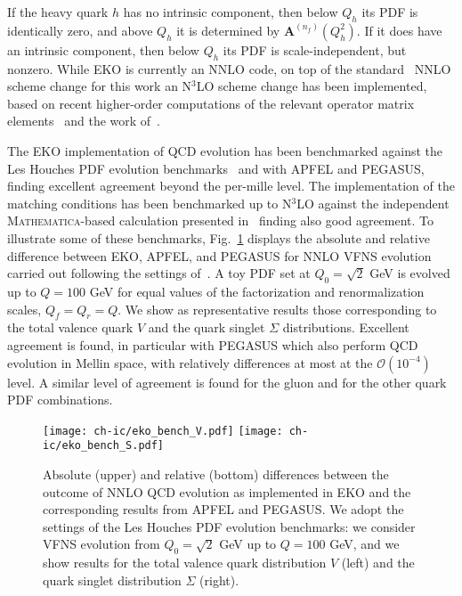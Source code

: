 If the heavy quark $h$ has no intrinsic component, then below $Q_h$
its PDF is identically zero, and above $Q_h$ it is determined by
$\mathbf{A}^{(n_f)}(Q_{h}^2)$. If it does have an intrinsic
component, then  below $Q_h$ its PDF is scale-independent, but nonzero.
While  \textsc{\small EKO} is currently an NNLO code, on
top of the standard~\cite{pdfnnlo} NNLO scheme change for this work
an N$^3$LO scheme change has been implemented, based on recent higher-order computations
of the relevant operator matrix elements~\cite{Bierenbaum:2009zt,Bierenbaum:2009mv,Ablinger:2010ty,Ablinger:2014vwa,Ablinger:2014uka,Behring:2014eya,Blumlein:2017wxd,Ablinger_2014,Ablinger:2014nga}
and the work of~\cite{zanoli}.

The  \textsc{\small EKO} implementation of QCD evolution has been
benchmarked against the Les Houches PDF evolution
benchmarks~\cite{Dittmar:2005ed,Giele:2002hx} and with
\textsc{\small APFEL} and \textsc{\small PEGASUS},
finding excellent agreement beyond the per-mille level.
%
The implementation of the  matching conditions
has been benchmarked up to N$^3$LO against the independent \textsc{\small Mathematica}-based calculation 
presented in~\cite{zanoli} finding also good agreement.
%
To illustrate some of these benchmarks, Fig.~\ref{fig:ic/EKObench} displays
the absolute and relative difference between \textsc{\small EKO},
\textsc{\small APFEL}, and \textsc{\small PEGASUS}
for NNLO VFNS evolution
carried out
following the settings of~\cite{Dittmar:2005ed,Giele:2002hx}.
%
A toy PDF set at $Q_0=\sqrt{2}$ GeV is evolved up to $Q=100$ GeV
for equal values of the factorization and renormalization scales, $Q_f=Q_r=Q$.
%
We show as representative results those corresponding to
the  total valence quark  $V$ 
and the quark singlet $\Sigma$ distributions.
%
Excellent agreement is found, in particular
with \textsc{\small PEGASUS} which also perform QCD
evolution in Mellin space, with relatively differences
at most at the $\mathcal{O}\left( 10^{-4}\right)$ level.
%
A similar level of agreement is found
for the gluon and for the other quark PDF combinations.

\begin{figure}[t]
    \begin{center}
        \texttt{[image: ch-ic/eko\_bench\_V.pdf]}
        \texttt{[image: ch-ic/eko\_bench\_S.pdf]}
        \caption{\small Absolute (upper) and relative (bottom) differences between 
        the outcome of NNLO QCD evolution
        as implemented in
        \textsc{\small EKO} and the
        corresponding results from \textsc{\small APFEL} and \textsc{\small PEGASUS}.
We adopt the settings of the Les Houches PDF evolution benchmarks: we
consider  VFNS evolution from $Q_0=\sqrt{2}$ GeV up to $Q=100$ GeV,
and we show  results for the total valence quark distribution $V$ (left)
and the quark singlet distribution $\Sigma$ (right).
      \label{fig:ic/EKObench} }
    \end{center}
\end{figure}



